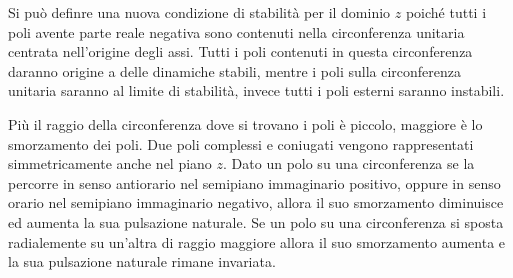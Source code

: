 \documentclass{article}
\numberwithin{equation}{subsection}
\begin{document}
Si può definre una nuova condizione di stabilità per il dominio $z$ poiché tutti i poli avente parte reale negativa sono contenuti nella circonferenza 
unitaria centrata nell'origine degli assi. Tutti i poli contenuti in questa circonferenza daranno origine a delle dinamiche stabili, mentre i poli sulla circonferenza unitaria 
saranno al limite di stabilità, invece tutti i poli esterni saranno instabili. 

\begin{center}
\end{center}

Più il raggio della circonferenza dove si trovano i poli è piccolo, maggiore è lo smorzamento dei poli. Due poli complessi e coniugati vengono rappresentati simmetricamente 
anche nel piano $z$. Dato un polo su una circonferenza se la percorre in senso antiorario nel semipiano immaginario positivo, oppure in senso orario nel semipiano immaginario 
negativo, allora il suo smorzamento diminuisce ed aumenta la sua pulsazione naturale. Se un polo su una circonferenza si sposta radialemente su un'altra di raggio maggiore 
allora il suo smorzamento aumenta e la sua pulsazione naturale rimane invariata.  
\end{document}
